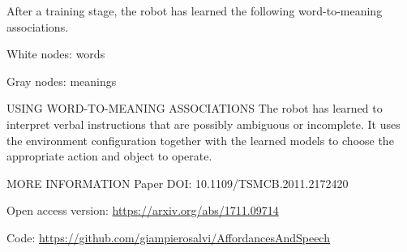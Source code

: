 \documentclass[aspectratio=169, 20pt]{beamer}
\begin{document}
\begin{frame}
  \large After a training stage, the robot has learned the following word-to-meaning associations.

  \vspace{1cm}
  White nodes: words
  
  Gray nodes: meanings
\end{frame}


\begin{frame}{\large USING WORD-TO-MEANING ASSOCIATIONS}
  The robot has learned to interpret verbal instructions that are possibly ambiguous or incomplete.
It uses the environment configuration together with the learned models to choose the appropriate action and object to operate.
\end{frame}

\begin{frame}{\large MORE INFORMATION}
  Paper DOI: 10.1109/TSMCB.2011.2172420

  \vspace{8mm}
  Open access version: \url{https://arxiv.org/abs/1711.09714}

  \vspace{8mm}
  Code: \url{https://github.com/giampierosalvi/AffordancesAndSpeech}
\end{frame}
\end{document}
